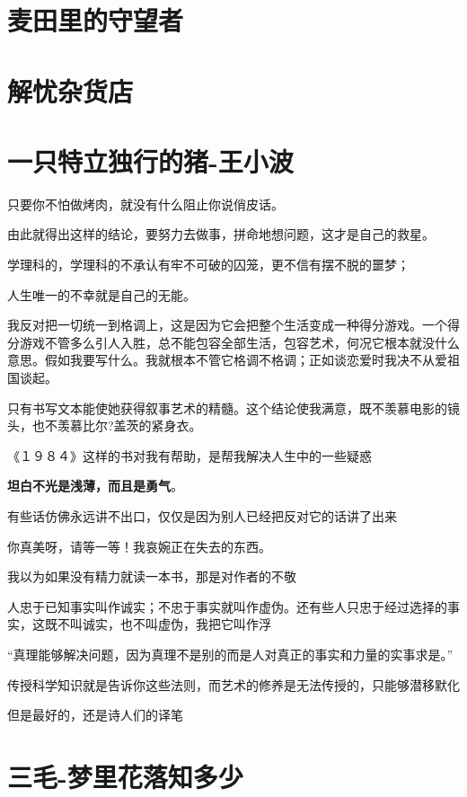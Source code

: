 \documentclass[UTF8,a4paper,8pt]{ctexbook}
\begin{document}
\chapter{麦田里的守望者}


	
\chapter{解忧杂货店}



\chapter{一只特立独行的猪-王小波}
	只要你不怕做烤肉，就没有什么阻止你说俏皮话。

	由此就得出这样的结论，要努力去做事，拼命地想问题，这才是自己的救星。
	
	学理科的，学理科的不承认有牢不可破的囚笼，更不信有摆不脱的噩梦；
	
	人生唯一的不幸就是自己的无能。
	
	我反对把一切统一到格调上，这是因为它会把整个生活变成一种得分游戏。一个得分游戏不管多么引人入胜，总不能包容全部生活，包容艺术，何况它根本就没什么意思。假如我要写什么。我就根本不管它格调不格调；正如谈恋爱时我决不从爱祖国谈起。
	
	只有书写文本能使她获得叙事艺术的精髓。这个结论使我满意，既不羡慕电影的镜头，也不羡慕比尔?盖茨的紧身衣。
	
	《１９８４》这样的书对我有帮助，是帮我解决人生中的一些疑惑
	
	\textbf{坦白不光是浅薄，而且是勇气}。
	
	
	有些话仿佛永远讲不出口，仅仅是因为别人已经把反对它的话讲了出来
	
	你真美呀，请等一等！我哀婉正在失去的东西。
	
	我以为如果没有精力就读一本书，那是对作者的不敬
	
	人忠于已知事实叫作诚实；不忠于事实就叫作虚伪。还有些人只忠于经过选择的事实，这既不叫诚实，也不叫虚伪，我把它叫作浮
	
	“真理能够解决问题，因为真理不是别的而是人对真正的事实和力量的实事求是。”
	
	传授科学知识就是告诉你这些法则，而艺术的修养是无法传授的，只能够潜移默化
	
	但是最好的，还是诗人们的译笔
	
	
	
\chapter{三毛-梦里花落知多少}
\end{document}
